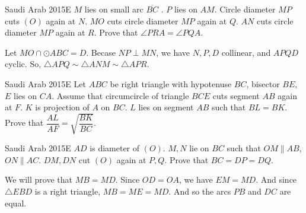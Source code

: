 \newpage
\begin{minipage}{.6\linewidth}
    {Saudi Arab 2015}{E}{
        $M$ lies on small arc $\overline{BC}$ . $P$
        lies on $AM$. Circle diameter $MP$ cuts $(O)$ again at $N$. $MO$ cuts circle
        diameter $MP$ again at $Q$. $AN$ cuts circle diameter $MP$ again at $R$. Prove
        that $\angle PRA = \angle PQA$.
    }

    \begin{solution} Let $ MO \cap \odot ABC = D $. Becase $
        NP\perp MN $, we have $ N, P, D $ collinear, and $ APQD $ cyclic.
        So, $ \triangle APQ\sim \triangle ANM \sim \triangle APR $.
    \end{solution} 

    \vspace{1em}

    {Saudi Arab 2015}{E}{
        Let $ABC$ be right triangle with hypotenuse $BC$, bisector $BE$, $E$ lies
        on $CA$. Assume that circumcircle of triangle $BCE$ cuts segment $AB$
        again at $F$. $K$ is projection of $A$ on $BC$. $L$ lies on segment $AB$
        such that $BL = BK$. Prove that $\dfrac{AL}{AF} = \sqrt{\dfrac{BK}{BC}}$.
    }

    \vspace{1em}

    {Saudi Arab 2015}{E}{
        $AD$ is diameter of $(O)$. $M, N$ lie on $BC$ such
        that $OM \parallel AB$, $ON \parallel AC$. $DM, DN$ cut $(O)$ again at $P, Q$.
        Prove that $BC = DP = DQ$.
    }

    \begin{solution}
        We will prove that $MB = MD$. Since $OD = OA$, we have $EM = MD$. And
        since $\triangle EBD$ is a right triangle, $MB = ME = MD$. And so the
        arcs $PB$ and $DC$ are equal.
    \end{solution}
\end{minipage}\hfill%
\begin{minipage}{.35\linewidth}
\end{minipage}




